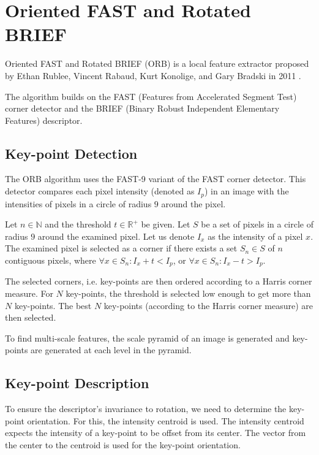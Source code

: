 \section{Oriented FAST and Rotated BRIEF}
Oriented FAST and Rotated BRIEF (ORB) is a local feature extractor proposed by Ethan Rublee, Vincent Rabaud, Kurt Konolige, and Gary Bradski in 2011 \cite{Rublee2011}.

The algorithm builds on the FAST (Features from Accelerated Segment Test) corner detector\cite{Rosten2006} and the BRIEF (Binary Robust Independent Elementary Features) descriptor\cite{Calonder2010}.

\subsection{Key-point Detection}
The ORB algorithm uses the FAST-9 variant of the FAST corner detector. This detector compares each pixel intensity (denoted as $I_p$) in an image with the intensities of pixels in a circle of radius $9$ around the pixel.

Let $n\in\mathbb{N}$ and the threshold $t\in\mathbb{R}^{+}$ be given. Let $S$ be a set of pixels in a circle of radius $9$ around the examined pixel. Let us denote $I_x$ as the intensity of a pixel $x$. The examined pixel is selected as a corner if there exists a set $S_n \in S$ of $n$ contiguous pixels, where $\forall x \in S_n: I_x + t < I_p$, or $\forall x \in S_n: I_x - t > I_p$.

The selected corners, i.e. key-points are then ordered according to a Harris corner measure\cite{Harris1988}. For $N$ key-points, the threshold is selected low enough to get more than $N$ key-points. The best $N$ key-points (according to the Harris corner measure) are then selected.

To find multi-scale features, the scale pyramid of an image is generated and key-points are generated at each level in the pyramid.

\subsection{Key-point Description}
To ensure the descriptor's invariance to rotation, we need to determine the key-point orientation. For this, the intensity centroid\cite{Rosin1999} is used. The intensity centroid expects the intensity of a key-point to be offset from its center. The vector from the center to the centroid is used for the key-point orientation.

